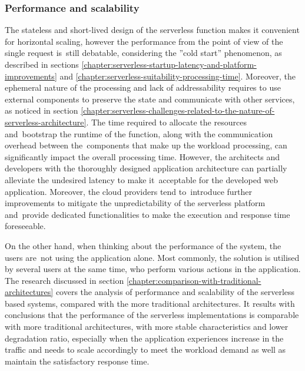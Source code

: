 \subsubsection{Performance and scalability} \label{chapter:serverless-suitability-performance-and-scalability}

The stateless and short-lived design of the serverless function makes it convenient for horizontal scaling, however the performance from the point of view of the single request is~still debatable, considering the ''cold start'' phenomenon, as described in sections  \ref{chapter:serverless-startup-latency-and-platform-improvements} and \ref{chapter:serverless-suitability-processing-time}.
Moreover, the ephemeral nature of the processing and lack of addressability requires to use external components to preserve the state and communicate with other services, as noticed in section \ref{chapter:serverless-challenges-related-to-the-nature-of-serverless-architecture}.
The time required to allocate the resources and~bootstrap the runtime of the function, along with the communication overhead between the~components that make up the workload processing, can significantly impact the overall processing time.
However, the architects and developers with the thoroughly designed application architecture can partially alleviate the undesired latency to make it~acceptable for the developed web application.
Moreover, the cloud providers tend to~introduce further improvements to mitigate the unpredictability of the serverless platform and~provide dedicated functionalities to make the execution and response time foreseeable.

On the other hand, when thinking about the performance of the system, the users are~not using the application alone.
Most commonly, the solution is utilised by several users at the same time, who perform various actions in the application.
The research discussed in section \ref{chapter:comparison-with-traditional-architectures} covers the analysis of performance and scalability of the serverless based systems, compared with the more traditional architectures.
It results with conclusions that the performance of the serverless implementations is comparable with more traditional architectures, with more stable characteristics and lower degradation ratio, especially when the application experiences increase in the traffic and needs to scale accordingly to meet the workload demand as well as maintain the satisfactory response time.

